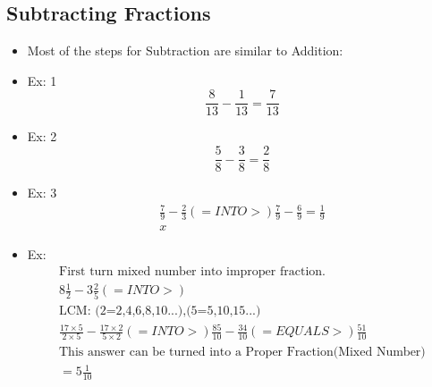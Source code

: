 \documentclass[]{article}
\begin{document}
\subsection{Subtracting Fractions}
\begin{itemize}
	\item Most of the steps for Subtraction are similar to Addition:
	\item Ex: 1
	\begin{equation}
		\frac{8}{13} - \frac{1}{13} = \frac{7}{13}
	\end{equation}
	\item Ex: 2
	\begin{equation}
		\frac{5}{8} - \frac{3}{8} = \frac{2}{8}
	\end{equation}
	\item Ex: 3
	\begin{align}
	\frac{7}{9} - \frac{2}{3} (=INTO>) \frac{7}{9} - \frac{6}{9} = \frac{1}{9}\\
	x
	\end{align}
	\item Ex:
	 \begin{align}
	 \text{First turn mixed number into improper fraction.} \\	
		8 \frac{1}{2} - 3 \frac{2}{5} (=INTO>)   \\
		\text{LCM: (2=2,4,6,8,10...),(5=5,10,15...)} \\
		\frac{17 \times 5}{2 \times 5} - \frac{17 \times 2}{5 \times 2} (=INTO>) \frac{85}{10} - \frac{34}{10} (=EQUALS>) \frac{51}{10}\\
		\text{This answer can be turned into a Proper Fraction(Mixed Number)} \\
		= 5 \frac{1}{10}
	\end{align}
	
	
	
\end{itemize}
\end{document}
